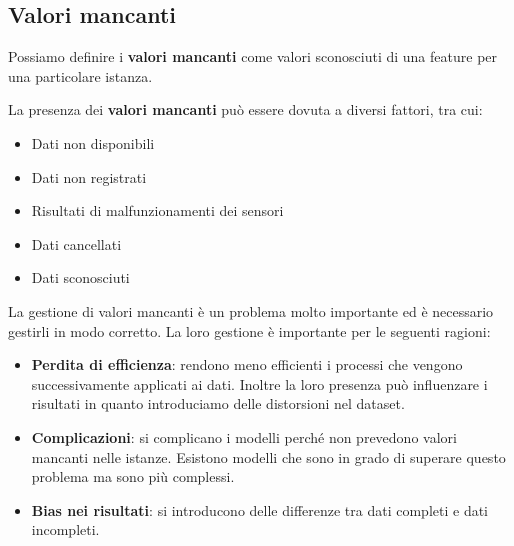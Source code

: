 \subsection{Valori mancanti}
\begin{definizione} 
      Possiamo definire i \textbf{valori mancanti} come valori sconosciuti di una
      feature per una particolare istanza.
\end{definizione}
La presenza dei \textbf{valori mancanti} può essere dovuta a diversi fattori,
tra cui:
\begin{itemize}
      \item Dati non disponibili
      \item Dati non registrati
      \item Risultati di malfunzionamenti dei sensori
      \item Dati cancellati
      \item Dati sconosciuti
\end{itemize}
La gestione di valori mancanti è un problema molto importante ed è necessario
gestirli in modo corretto. La loro gestione è importante per le seguenti ragioni:
\begin{itemize}
      \item \textbf{Perdita di efficienza}: rendono meno efficienti i processi che
            vengono successivamente applicati ai dati. Inoltre la loro presenza può
            influenzare i risultati in quanto introduciamo delle distorsioni nel
            dataset.
      \item \textbf{Complicazioni}: si complicano i modelli perché non prevedono
            valori mancanti nelle istanze. Esistono modelli che sono in grado di
            superare questo problema ma sono più complessi.
      \item \textbf{Bias nei risultati}: si introducono delle differenze tra dati
            completi e dati incompleti.
\end{itemize}

